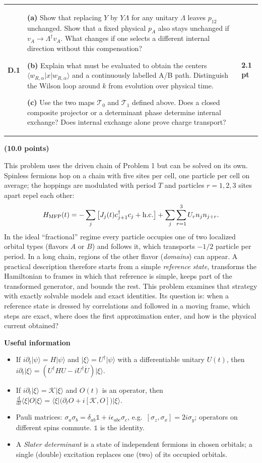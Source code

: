 \documentclass[11pt,a4paper]{article}
\makeatletter
\newcommand{\id}{\mathds 1}
\newcounter{problemno}
\newcounter{figc}
\newcommand{\pagecode}{G}
\newcommand{\ket}[1]{\lvert #1\rangle}
\newcommand{\bra}[1]{\langle #1\rvert}
\newcommand{\dd}{\mathrm d}
\newcommand{\hc}{\mathrm{h.c.}}
\newcommand{\problem}[3]{\clearpage\setcounter{problemno}{#1}\renewcommand{\pagecode}{T#1}\setcounter{page}{1}\setcounter{figc}{0}{\LARGE\bfseries\color{ink}Problem #1: #2}\hfill{\large\bfseries(#3 points)}\par\medskip}
\newcommand{\smallheading}[1]{\par\Needspace{6\baselineskip}\medskip\textbf{#1}\par}
\newcommand{\question}[3]{\begin{tcolorbox}[enhanced,colback=white,colframe=rulegray,boxrule=0.5pt,arc=0pt,left=7pt,right=7pt,top=7pt,bottom=7pt,before skip=9pt,after skip=9pt]\begin{tabularx}{\linewidth}{@{}>{\bfseries}p{10mm}X>{\raggedleft\arraybackslash}p{13mm}@{}}#1&#3&\textbf{#2 pt}\end{tabularx}\end{tcolorbox}}
\makeatother
\begin{document}
\question{D.1}{2.1}{\textbf{(a)} Show that replacing $Y$ by $Y\Lambda$ for any unitary $\Lambda$ leaves $p_{12}$ unchanged. Show that a fixed physical $p_A$ also stays unchanged if $v_A\to \Lambda^\dagger v_A$. What changes if one selects a different internal direction without this compensation?\par
\textbf{(b)} Explain what must be evaluated to obtain the centers $\langle w_{R,\alpha}|x|w_{R,\alpha}\rangle$ and a continuously labelled A/B path. Distinguish the Wilson loop around $k$ from evolution over physical time.\par
\textbf{(c)} Use the two maps $\mathscr T_0$ and $\mathscr T_1$ defined above. Does a closed composite projector or a determinant phase determine internal exchange? Does internal exchange alone prove charge transport?}

\problem{2}{Correlations and the physical current}{10.0}

This problem uses the driven chain of Problem 1 but can be solved on its own. Spinless fermions hop on a chain with five sites per cell, one particle per cell on average; the hoppings are modulated with period $T$ and particles $r=1,2,3$ sites apart repel each other:
\[
H_{\rm MFP}(t)=-\sum_j\big[J_j(t)c_{j+1}^\dagger c_j+\hc\big]+\sum_{j}\sum_{r=1}^{3}U_r n_jn_{j+r}.
\]
In the ideal ``fractional'' regime every particle occupies one of two localized orbital types (flavors $A$ or $B$) and follows it, which transports $-1/2$ particle per period. In a long chain, regions of the other flavor (\emph{domains}) can appear. A practical description therefore starts from a simple \emph{reference state}, transforms the Hamiltonian to frames in which that reference is simple, keeps part of the transformed generator, and bounds the rest. This problem examines that strategy with exactly solvable models and exact identities. Its question is: when a reference state is dressed by correlations and followed in a moving frame, which steps are exact, where does the first approximation enter, and how is the physical current obtained?

\smallheading{Useful information}
\begin{itemize}[leftmargin=6mm,itemsep=2pt,topsep=2pt]
\item If $i\partial_t\ket\psi=H\ket\psi$ and $\ket\xi=U^\dagger\ket\psi$ with a differentiable unitary $U(t)$, then $i\partial_t\ket\xi=(U^\dagger HU-iU^\dagger\dot U)\ket\xi$.
\item If $i\partial_t\ket\xi=\mathcal K\ket\xi$ and $O(t)$ is an operator, then $\frac{\dd}{\dd t}\bra\xi O\ket\xi=\bra\xi\big(\partial_tO+i[\mathcal K,O]\big)\ket\xi$.
\item Pauli matrices: $\sigma_a\sigma_b=\delta_{ab}\id+i\epsilon_{abc}\sigma_c$, e.g.\ $[\sigma_z,\sigma_x]=2i\sigma_y$; operators on different spins commute. $\id$ is the identity.
\item A \emph{Slater determinant} is a state of independent fermions in chosen orbitals; a single (double) excitation replaces one (two) of its occupied orbitals.
\end{itemize}
\end{document}
